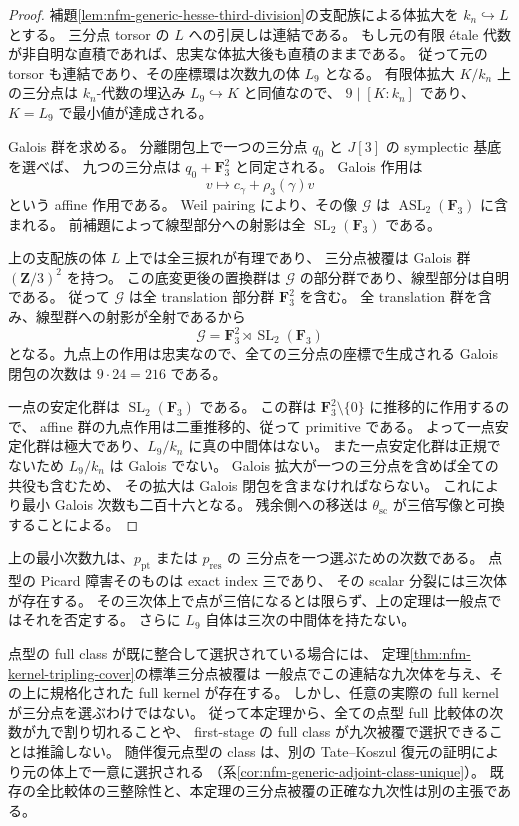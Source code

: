 \begin{proof}
補題\ref{lem:nfm-generic-hesse-third-division}の支配族による体拡大を
$k_n\hookrightarrow L$ とする。
三分点 torsor の $L$ への引戻しは連結である。
もし元の有限 \'etale 代数が非自明な直積であれば、忠実な体拡大後も直積のままである。
従って元の torsor も連結であり、その座標環は次数九の体 $L_9$ となる。
有限体拡大 $K/k_n$ 上の三分点は $k_n$-代数の埋込み $L_9\hookrightarrow K$ と同値なので、
$9\mid[K:k_n]$ であり、$K=L_9$ で最小値が達成される。

Galois 群を求める。
分離閉包上で一つの三分点 $q_0$ と $J[3]$ の symplectic 基底を選べば、
九つの三分点は $q_0+\mathbf F_3^2$ と同定される。
Galois 作用は
\[
 v\longmapsto c_\gamma+\rho_3(\gamma)v
\]
という affine 作用である。
Weil pairing により、その像 $\mathcal G$ は
$\operatorname{ASL}_2(\mathbf F_3)$ に含まれる。
前補題によって線型部分への射影は全 $\operatorname{SL}_2(\mathbf F_3)$ である。

上の支配族の体 $L$ 上では全三捩れが有理であり、
三分点被覆は Galois 群 $(\mathbf Z/3)^2$ を持つ。
この底変更後の置換群は $\mathcal G$ の部分群であり、線型部分は自明である。
従って $\mathcal G$ は全 translation 部分群 $\mathbf F_3^2$ を含む。
全 translation 群を含み、線型群への射影が全射であるから
\[
 \mathcal G=\mathbf F_3^2\rtimes\operatorname{SL}_2(\mathbf F_3)
\]
となる。九点上の作用は忠実なので、全ての三分点の座標で生成される
Galois 閉包の次数は $9\cdot24=216$ である。

一点の安定化群は $\operatorname{SL}_2(\mathbf F_3)$ である。
この群は $\mathbf F_3^2\setminus\{0\}$ に推移的に作用するので、
affine 群の九点作用は二重推移的、従って primitive である。
よって一点安定化群は極大であり、$L_9/k_n$ に真の中間体はない。
また一点安定化群は正規でないため $L_9/k_n$ は Galois でない。
Galois 拡大が一つの三分点を含めば全ての共役も含むため、
その拡大は Galois 閉包を含まなければならない。
これにより最小 Galois 次数も二百十六となる。
残余側への移送は $\theta_{\mathrm{sc}}$ が三倍写像と可換することによる。
\end{proof}

\begin{remark}
上の最小次数九は、$p_{\mathrm{pt}}$ または $p_{\mathrm{res}}$ の
三分点を一つ選ぶための次数である。
点型の Picard 障害そのものは exact index 三であり、
その scalar 分裂には三次体が存在する。
その三次体上で点が三倍になるとは限らず、上の定理は一般点ではそれを否定する。
さらに $L_9$ 自体は三次の中間体を持たない。

点型の full class が既に整合して選択されている場合には、
定理\ref{thm:nfm-kernel-tripling-cover}の標準三分点被覆は
一般点でこの連結な九次体を与え、その上に規格化された full kernel が存在する。
しかし、任意の実際の full kernel が三分点を選ぶわけではない。
従って本定理から、全ての点型 full 比較体の次数が九で割り切れることや、
first-stage の full class が九次被覆で選択できることは推論しない。
随伴復元点型の class は、別の Tate--Koszul 復元の証明により元の体上で一意に選択される
（系\ref{cor:nfm-generic-adjoint-class-unique}）。
既存の全比較体の三整除性と、本定理の三分点被覆の正確な九次性は別の主張である。
\end{remark}


